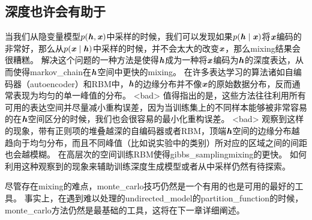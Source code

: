 \subsection{深度也许会有助于}
\label{sec:depth_may_help_mixing}

当我们从隐变量模型$p(\boldsymbol{\mathit{h}},\boldsymbol{\mathit{x}})$中采样的时候，我们可以发现如果$p(\boldsymbol{\mathit{h}}\mid \boldsymbol{\mathit{x}})$将$\boldsymbol{\mathit{x}}$编码的非常好，那么从$p(\boldsymbol{\mathit{x}} \mid \boldsymbol{\mathit{h}})$中采样的时候，并不会太大的改变$\boldsymbol{\mathit{x}}$，那么\gls{mixing}结果会很糟糕。
解决这个问题的一种方法是使得$\boldsymbol{\mathit{h}}$成为一种将$\boldsymbol{\mathit{x}}$编码为$\boldsymbol{\mathit{h}}$的深度表达，从而使得\gls{markov_chain}在$\boldsymbol{\mathit{h}}$空间中更快的\gls{mixing}。
在许多表达学习的算法诸如自编码器（autoencoder）和\gls{RBM}中，$\boldsymbol{\mathit{h}}$的边缘分布并不像$\boldsymbol{\mathit{x}}$的原始数据分布，反而通常表现为均匀的单一峰值的分布。
<bad> 值得指出的是，这些方法往往利用所有可用的表达空间并尽量减小重构误差，因为当训练集上的不同样本能够被非常容易的在$\boldsymbol{\mathit{h}}$空间区分的时候，我们也会很容易的最小化重构误差。
<bad> \citep{Bengio-et-al-ICML2013-small}观察到这样的现象，带有正则项的堆叠越深的自编码器或者\gls{RBM}，顶端$\boldsymbol{\mathit{h}}$空间的边缘分布越趋向于均匀分布，而且不同峰值（比如说实验中的类别）所对应的区域之间的间距也会越模糊。
在高层次的空间训练\gls{RBM}使得\gls{gibbs_sampling}\gls{mixing}的更快。
如何利用这种观察到的现象来辅助训练深度生成模型或者从中采样仍然有待探索。

尽管存在\gls{mixing}的难点，\gls{monte_carlo}技巧仍然是一个有用的也是可用的最好的工具。
事实上，在遇到难以处理的\gls{undirected_model}的\gls{partition_function}的时候，\gls{monte_carlo}方法仍然是最基础的工具，这将在下一章详细阐述。












